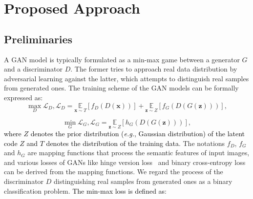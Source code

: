 \documentclass[10pt,journal,compsoc]{IEEEtran}
\newcommand{\revise}[1]{\textcolor{black}{#1}}
\begin{document}
\section{Proposed Approach}


\subsection{Preliminaries}
\label{motivation}
A GAN model is typically formulated as a min-max game between a generator $G$ and a discriminator $D$.
%
The former tries to approach real data distribution by adversarial learning against the latter, which attempts to distinguish real samples from generated ones.
%
The training scheme of the GAN models can be formally expressed as:
\begin{equation}
\max _{D} \mathcal{L}_{D}, \mathcal{L}_{D}=\underset{\boldsymbol{x} \sim T}{\mathbb{E}}\left[f_{D}(D(\boldsymbol{x}))\right]+\underset{\boldsymbol{z} \sim Z}{\mathbb{E}}\left[f_{G}(D(G(\boldsymbol{z})))\right],
\end{equation}



\begin{equation}
\min _{G} \mathcal{L}_{G}, \mathcal{L}_{G}=\underset{\boldsymbol{z} \sim Z}{\mathbb{E}}\left[h_{G}(D(G(\boldsymbol{z})))\right],
\end{equation}
\revise{where $Z$ denotes the prior distribution (\emph{e.g.}, Gaussian distribution) of the latent code $Z$ and $T$ denotes the distribution of the training data}.
The notations $f_{D}$, $f_{G}$ and $h_{G}$ are mapping functions that process the semantic features of input images, and various losses of GANs like hinge version loss~\cite{heusel2017gans} and binary cross-entropy loss~\cite{radford2016unsupervised} can be derived from the mapping functions.
%
We regard the process of the discriminator $D$ distinguishing real samples from generated ones as a binary classification problem.
%
\revise{The min-max loss is defined as}:
\end{document}
